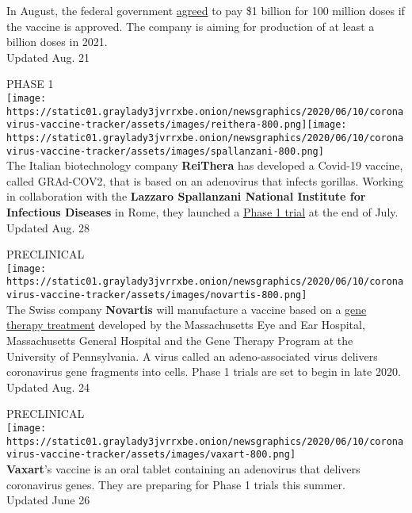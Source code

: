 In August, the federal government
\href{https://www.jnj.com/johnson-johnson-announces-agreement-with-u-s-government-for-100-million-doses-of-investigational-covid-19-vaccine}{agreed}
to pay \$1 billion for 100 million doses if the vaccine is approved. The
company is aiming for production of at least a billion doses in 2021.\\
Updated Aug. 21

PHASE 1\\
\texttt{[image: https://static01.graylady3jvrrxbe.onion/newsgraphics/2020/06/10/coronavirus-vaccine-tracker/assets/images/reithera-800.png]}\texttt{[image: https://static01.graylady3jvrrxbe.onion/newsgraphics/2020/06/10/coronavirus-vaccine-tracker/assets/images/spallanzani-800.png]}\\
The Italian biotechnology company \textbf{ReiThera} has developed a
Covid-19 vaccine, called GRAd-COV2, that is based on an adenovirus that
infects gorillas. Working in collaboration with the \textbf{Lazzaro
Spallanzani National Institute for Infectious Diseases} in Rome, they
launched a
\href{https://clinicaltrials.gov/ct2/show/NCT04528641?term=vaccine\&recrs=adf\&cond=COVID-19\&phase=0123\&sort=nwst\&draw=2\&rank=2}{Phase
1 trial} at the end of July.\\
Updated Aug. 28

PRECLINICAL\\
\texttt{[image: https://static01.graylady3jvrrxbe.onion/newsgraphics/2020/06/10/coronavirus-vaccine-tracker/assets/images/novartis-800.png]}\\
The Swiss company \textbf{Novartis} will manufacture a vaccine based on
a
\href{https://www.nytimes3xbfgragh.onion/2020/05/04/health/gene-therapy-harvard-coronavirus.html}{gene
therapy treatment} developed by the Massachusetts Eye and Ear Hospital,
Massachusetts General Hospital and the Gene Therapy Program at the
University of Pennsylvania. A virus called an adeno-associated virus
delivers coronavirus gene fragments into cells. Phase 1 trials are set
to begin in late 2020.\\
Updated Aug. 24

PRECLINICAL\\
\texttt{[image: https://static01.graylady3jvrrxbe.onion/newsgraphics/2020/06/10/coronavirus-vaccine-tracker/assets/images/vaxart-800.png]}\\
\textbf{Vaxart}'s vaccine is an oral tablet containing an adenovirus
that delivers coronavirus genes. They are preparing for Phase 1 trials
this summer.\\
Updated June 26

